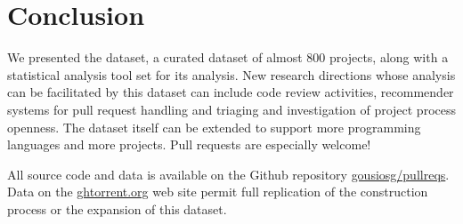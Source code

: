 \documentclass{sig-alternate}
\begin{document}
\section{Conclusion}

We presented the \pullreqs dataset, a curated dataset of almost 800 projects,
along with a statistical analysis tool set for its analysis. New research directions whose analysis can be facilitated
by this dataset can include code review activities, recommender systems for pull
request handling and triaging and investigation of project process openness. The
dataset itself can be extended to support more programming languages and more
projects. Pull requests are especially welcome!

All source code and data is available on the Github repository
\href{https://github.com/gousiosg/pullreqs}{gousiosg/pullreqs}. Data on the
\href{http://ghtorrent.org}{ghtorrent.org} web site permit full replication
of the construction process or the expansion of this dataset.


\balance

  
\end{document}
